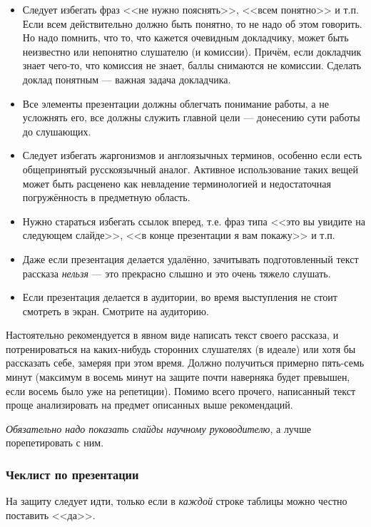\documentclass{article}
\begin{document}
\begin{itemize}
    \item Следует избегать фраз <<не нужно пояснять>>, <<всем понятно>> и т.п. Если всем действительно должно быть понятно, то не надо об этом говорить. Но надо помнить, что то, что кажется очевидным докладчику, может быть неизвестно или непонятно слушателю (и комиссии). Причём, если докладчик знает чего-то, что комиссия не знает, баллы снимаются не комиссии. Сделать доклад понятным --- важная задача докладчика.
    \item Все элементы презентации должны облегчать понимание работы, а не усложнять его, все должны служить главной цели --- донесению сути работы до слушающих.
    \item Следует избегать жаргонизмов и англоязычных терминов, особенно если есть общепринятый русскоязычный аналог. Активное использование таких вещей может быть расценено как невладение терминологией и недостаточная погружённость в предметную область.
    \item Нужно стараться избегать ссылок вперед, т.е. фраз типа <<это вы увидите на следующем слайде>>, <<в конце презентации я вам покажу>> и т.п.
    \item Даже если презентация делается удалённо, зачитывать подготовленный текст рассказа \emph{нельзя} --- это прекрасно слышно и это очень тяжело слушать.
    \item Если презентация делается в аудитории, во время выступления не стоит смотреть в экран. Смотрите на аудиторию.
\end{itemize}

Настоятельно рекомендуется в явном виде написать текст своего рассказа, и потренироваться на каких-нибудь сторонних слушателях (в идеале) или хотя бы рассказать себе, замеряя при этом время. Должно получиться примерно пять-семь минут (максимум в восемь минут на защите почти наверняка будет превышен, если восемь было уже на репетиции). Помимо всего прочего, написанный текст проще анализировать на предмет описанных выше рекомендаций.

\emph{Обязательно надо показать слайды научному руководителю}, а лучше порепетировать с ним.

\subsubsection{Чеклист по презентации}

На защиту следует идти, только если в \emph{каждой} строке таблицы можно честно поставить <<да>>.

\renewcommand{\arraystretch}{1.2}
\end{document}
